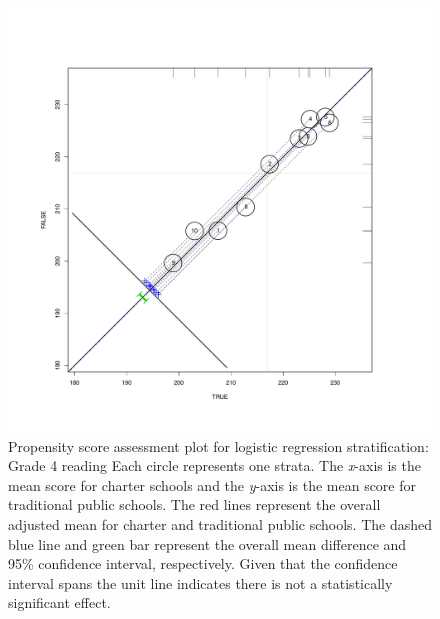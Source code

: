\begin{figure}[h!]
\begin{center}
\includegraphics[trim=0 .7in 0 .7in]{../Figures2009/g4read-circpsa10.pdf}
\caption[Propensity score assessment plot for logistic regression stratification: Grade 4 reading]{Propensity score assessment plot for logistic regression stratification: Grade 4 reading Each circle represents one strata. The \textit{x}-axis is the mean score for charter schools and the \textit{y}-axis is the mean score for traditional public schools. The red lines represent the overall adjusted mean for charter and traditional public schools. The dashed blue line and green bar represent the overall mean difference and 95\% confidence interval, respectively. Given that the confidence interval spans the unit line indicates there is not a statistically significant effect.}
\end{center}
\end{figure}

\clearpage



